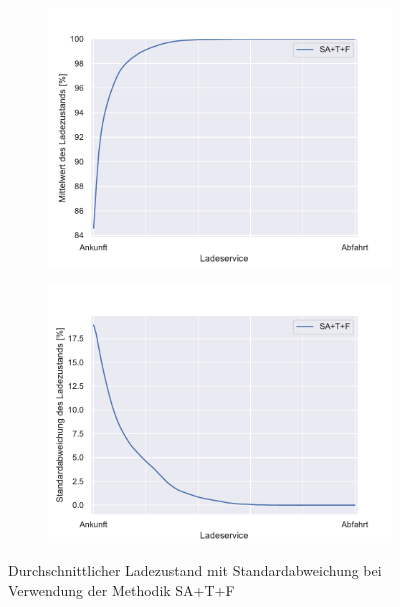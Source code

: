 \begin{figure}
	\begin{subfigure}{0.49\linewidth}
		\includegraphics[width=\linewidth]{img/SA_wT/SlottedAloha_waitingTime_VDE_tau_6_soc_mean.pdf}
        \label{ABB_SAwtSocMEAN}
	\end{subfigure}
	\begin{subfigure}{0.49\linewidth}
		\includegraphics[width=\linewidth]{img/SA_wT/SlottedAloha_waitingTime_VDE_tau_6_soc_std.pdf}
        \label{ABB_SAwtSocSTD}
	\end{subfigure}
	\caption{Durchschnittlicher Ladezustand mit Standardabweichung bei Verwendung der Methodik SA+T+F}
\end{figure}

